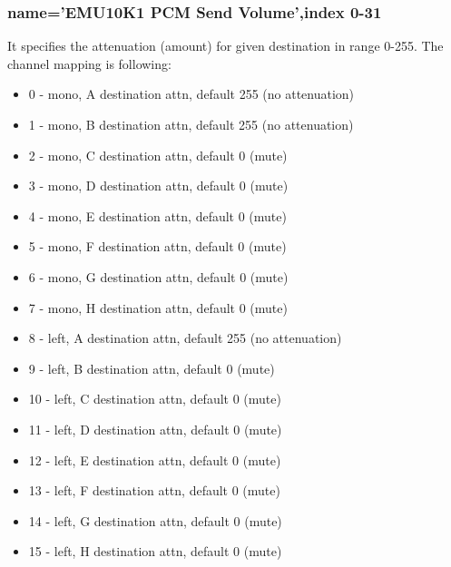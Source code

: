 \documentclass[a4paper,8pt,english]{sphinxmanual}
\begin{document}
\subsubsection{name='EMU10K1 PCM Send Volume',index 0-31}
\label{sound/cards/audigy-mixer:name-emu10k1-pcm-send-volume-index-0-31}
It specifies the attenuation (amount) for given destination in range 0-255.
The channel mapping is following:
\begin{itemize}
\item {} 
0 -  mono, A destination attn, default 255 (no attenuation)

\item {} 
1 -  mono, B destination attn, default 255 (no attenuation)

\item {} 
2 -  mono, C destination attn, default 0 (mute)

\item {} 
3 -  mono, D destination attn, default 0 (mute)

\item {} 
4 -  mono, E destination attn, default 0 (mute)

\item {} 
5 -  mono, F destination attn, default 0 (mute)

\item {} 
6 -  mono, G destination attn, default 0 (mute)

\item {} 
7 -  mono, H destination attn, default 0 (mute)

\item {} 
8 -  left, A destination attn, default 255 (no attenuation)

\item {} 
9 -  left, B destination attn, default 0 (mute)

\item {} 
10 -  left, C destination attn, default 0 (mute)

\item {} 
11 -  left, D destination attn, default 0 (mute)

\item {} 
12 -  left, E destination attn, default 0 (mute)

\item {} 
13 -  left, F destination attn, default 0 (mute)

\item {} 
14 -  left, G destination attn, default 0 (mute)

\item {} 
15 -  left, H destination attn, default 0 (mute)


\end{itemize}
\end{document}
